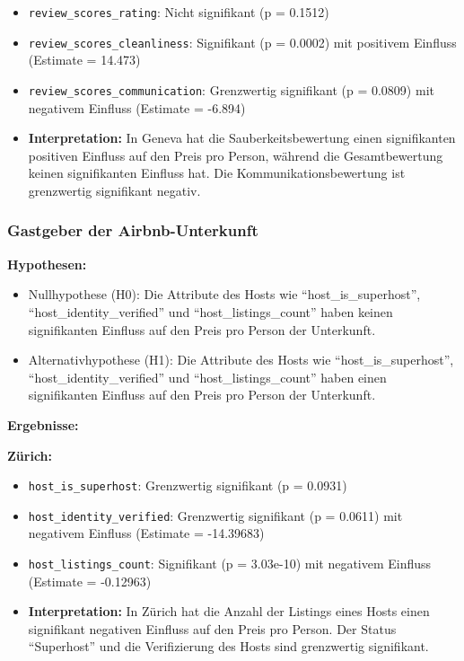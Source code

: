 \documentclass[
  journal,
]{IEEEtran}%
\providecommand{\tightlist}{%
  \setlength{\itemsep}{0pt}\setlength{\parskip}{0pt}}\usepackage{longtable,booktabs,array}
\begin{document}
\begin{itemize}
\item
  \texttt{review\_scores\_rating}: Nicht signifikant (p = 0.1512)
\item
  \texttt{review\_scores\_cleanliness}: Signifikant (p = 0.0002) mit
  positivem Einfluss (Estimate = 14.473)
\item
  \texttt{review\_scores\_communication}: Grenzwertig signifikant (p =
  0.0809) mit negativem Einfluss (Estimate = -6.894)
\item
  \textbf{Interpretation:} In Geneva hat die Sauberkeitsbewertung einen
  signifikanten positiven Einfluss auf den Preis pro Person, während die
  Gesamtbewertung keinen signifikanten Einfluss hat. Die
  Kommunikationsbewertung ist grenzwertig signifikant negativ.
\end{itemize}

\hypertarget{gastgeber-der-airbnb-unterkunft}{%
\subsubsection{Gastgeber der
Airbnb-Unterkunft}\label{gastgeber-der-airbnb-unterkunft}}

\textbf{Hypothesen:}

\begin{itemize}
\tightlist
\item
  Nullhypothese (H0): Die Attribute des Hosts wie
  ``host\_is\_superhost'', ``host\_identity\_verified'' und
  ``host\_listings\_count'' haben keinen signifikanten Einfluss auf den
  Preis pro Person der Unterkunft.
\item
  Alternativhypothese (H1): Die Attribute des Hosts wie
  ``host\_is\_superhost'', ``host\_identity\_verified'' und
  ``host\_listings\_count'' haben einen signifikanten Einfluss auf den
  Preis pro Person der Unterkunft.
\end{itemize}

\textbf{Ergebnisse:}

\textbf{Zürich:}

\begin{itemize}
\item
  \texttt{host\_is\_superhost}: Grenzwertig signifikant (p = 0.0931)
\item
  \texttt{host\_identity\_verified}: Grenzwertig signifikant (p =
  0.0611) mit negativem Einfluss (Estimate = -14.39683)
\item
  \texttt{host\_listings\_count}: Signifikant (p = 3.03e-10) mit
  negativem Einfluss (Estimate = -0.12963)
\item
  \textbf{Interpretation:} In Zürich hat die Anzahl der Listings eines
  Hosts einen signifikant negativen Einfluss auf den Preis pro Person.
  Der Status ``Superhost'' und die Verifizierung des Hosts sind
  grenzwertig signifikant.
\end{itemize}
\end{document}

